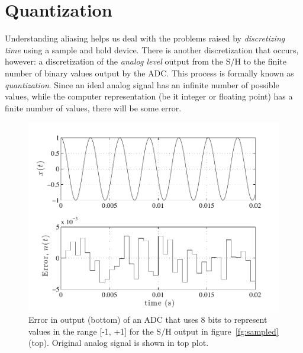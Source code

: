 \section{Quantization}

Understanding aliasing helps us deal with the problems raised by \emph{discretizing time} using
a sample and hold device. There is another discretization that occurs,
however: a discretization of the \emph{analog level} output from the S/H to
the finite number of binary values output by the ADC. This process is
formally known as \emph{quantization}. Since an ideal analog signal
has an infinite number of possible values, while the computer
representation (be it integer or floating point) has a finite number
of values, there will be some error.

\begin{figure}
\centerline{\includegraphics[width=\textwidth]{ch-computer/quant-error_2000}}
\caption[Error in output for 8-bit ADC]{Error in output (bottom) of an
ADC that uses 8 bits to represent values in the range [-1, +1] for the
S/H output in figure~\protect\ref{fg:sampled} (top). Original analog
signal is shown in top plot.\label{fg:quant2k}}
\end{figure}

